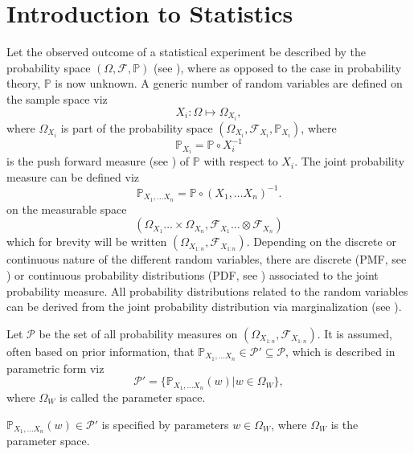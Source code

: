 \chapter{Introduction to Statistics}
\label{chp:statistics_introduction}
Let the observed outcome of a statistical experiment be described by the probability space $(\Omega, \mathcal{F}, \mathbb{P})$ (see ), where as opposed to the case in probability theory, $\mathbb{P}$ is now unknown. A generic number of random variables are defined on the sample space viz~\cite{orbanz2009functional,tausk2023basic, drewitz2019introduction,chan2021introduction}
\begin{equation}
	X_i: \Omega \mapsto \Omega_{X_i},
\end{equation} 
where $\Omega_{X_i}$ is part of the probability space $(\Omega_{X_i},\mathcal{F}_{X_i},\mathbb{P}_{X_i})$, where
\begin{equation}
	\mathbb{P}_{X_i} = \mathbb{P}\circ X_i^{-1}
\end{equation}
is the push forward measure (see ) of $\mathbb{P}$ with respect to $X_i$. The joint probability measure can be defined viz
\begin{equation}
	\mathbb{P}_{X_1,\dots X_n}= \mathbb{P}\circ(X_1,\dots X_n)^{-1}.
\end{equation}
on the measurable space 
\begin{equation}
	(\Omega_{X_1} \dots\times \Omega_{X_n}, \mathcal{F}_{X_1} \dots \otimes \mathcal{F}_{X_n})
\end{equation}
which for brevity will be written $(\Omega_{X_{1:n}},\mathcal{F}_{X_{1:n}})$. Depending on the discrete or continuous nature of the different random variables, there are discrete (PMF, see ) or continuous probability distributions (PDF, see ) associated to the joint probability measure. All probability distributions related to the random variables can be derived from the joint probability distribution via marginalization (see ).

\begin{definition}
	Let $\mathcal{P}$ be the set of all probability measures on $(\Omega_{X_{1:n}},\mathcal{F}_{X_{1:n}})$. It is assumed, often based on prior information, that $\mathbb{P}_{X_1,\dots X_n}\in \mathcal{P}'\subseteq \mathcal{P}$, which is described in parametric form viz
	\begin{equation}
		\mathcal{P}'=\{\mathbb{P}_{X_1,\dots X_n}(w)| w \in \Omega_W\},
	\end{equation}
	where $\Omega_W$ is called the parameter space.
\end{definition}
\begin{definition}
	\label{def:parameter_space}
	$\mathbb{P}_{X_1,\dots X_n}(w)\in \mathcal{P}'$ is specified by parameters $w\in \Omega_W$, where $\Omega_W$ is the parameter space.
\end{definition}


